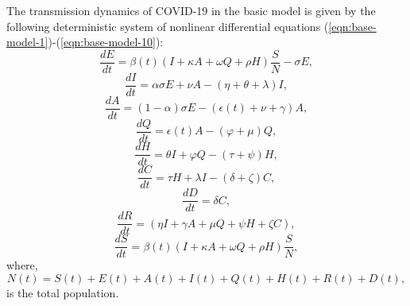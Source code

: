 \documentclass[authoryear,preprint]{elsarticle}
\begin{document}
The transmission dynamics of COVID-19 in the basic model is given by the following deterministic system of nonlinear differential equations (\ref{eqn:base-model-1})-(\ref{eqn:base-model-10}):
\begin{equation}
\frac{dE}{dt} = \beta(t) \left( I + \kappa A + \omega Q + \rho H \right) \frac{S}{N} - \sigma E, 
\label{eqn:base-model-1}
\end{equation}
\begin{equation}
\frac{dI}{dt} = \alpha \sigma E + \nu A - \left( \eta + \theta + \lambda \right) I,
\label{eqn:base-model-2}
\end{equation}
\begin{equation}
\frac{dA}{dt} =  \left( 1-\alpha \right) \sigma E - \left( \epsilon(t) + \nu + \gamma \right) A,
\label{eqn:base-model-3}
\end{equation}
\begin{equation}
\frac{dQ}{dt} = \epsilon(t) A - \left( \varphi + \mu \right) Q,
\label{eqn:base-model-4}
\end{equation}
\begin{equation}
\frac{dH}{dt} = \theta I + \varphi Q - \left( \tau + \psi \right) H ,
\label{eqn:base-model-5}
\end{equation}
\begin{equation}
\frac{dC}{dt} =  \tau H + \lambda I - \left( \delta + \zeta \right) C,
\label{eqn:base-model-6}
\end{equation}
\begin{equation}
\frac{dD}{dt} =  \delta C,
\label{eqn:base-model-7}
\end{equation}
\begin{equation}
\frac{dR}{dt} =  \left( \eta I +  \gamma A + \mu Q + \psi H + \zeta C \right),
\label{eqn:base-model-8}
\end{equation}
\begin{equation}
\frac{dS}{dt} = \beta(t) \left( I + \kappa A + \omega Q + \rho H \right) \frac{S}{N},
\label{eqn:base-model-9}
\end{equation}
where,
\begin{equation}
N(t) = S(t) + E(t) + A(t) + I(t) + Q(t) + H(t) + R(t) + D(t),
\label{eqn:base-model-10}
\end{equation}
is the total population. 
\end{document}
